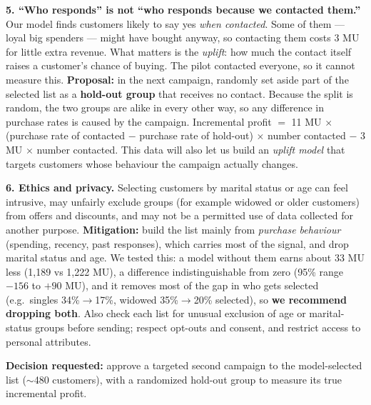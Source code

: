 \documentclass[11pt]{article}
\begin{document}
\textbf{5. ``Who responds'' is not ``who responds because we contacted them.''} Our model finds customers likely to say yes \emph{when contacted}. Some of them --- loyal big spenders --- might have bought anyway, so contacting them costs 3 MU for little extra revenue. What matters is the \emph{uplift}: how much the contact itself raises a customer's chance of buying. The pilot contacted everyone, so it cannot measure this. \textbf{Proposal:} in the next campaign, randomly set aside part of the selected list as a \textbf{hold-out group} that receives no contact. Because the split is random, the two groups are alike in every other way, so any difference in purchase rates is caused by the campaign. Incremental profit $=$ 11 MU $\times$ (purchase rate of contacted $-$ purchase rate of hold-out) $\times$ number contacted $-$ 3 MU $\times$ number contacted. This data will also let us build an \emph{uplift model} that targets customers whose behaviour the campaign actually changes.

\textbf{6. Ethics and privacy.} Selecting customers by marital status or age can feel intrusive, may unfairly exclude groups (for example widowed or older customers) from offers and discounts, and may not be a permitted use of data collected for another purpose. \textbf{Mitigation:} build the list mainly from \emph{purchase behaviour} (spending, recency, past responses), which carries most of the signal, and drop marital status and age. We tested this: a model without them earns about 33 MU less (1,189 vs 1,222 MU), a difference indistinguishable from zero (95\% range $-156$ to $+90$ MU), and it removes most of the gap in who gets selected (e.g.\ singles 34\%$\to$17\%, widowed 35\%$\to$20\% selected), so \textbf{we recommend dropping both}. Also check each list for unusual exclusion of age or marital-status groups before sending; respect opt-outs and consent, and restrict access to personal attributes.

\textbf{Decision requested:} approve a targeted second campaign to the model-selected list ($\sim$480 customers), with a randomized hold-out group to measure its true incremental profit.
\end{document}
